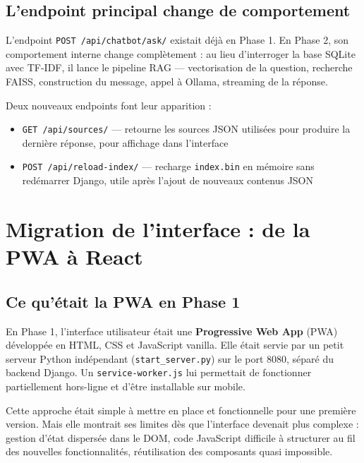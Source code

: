 \documentclass[11pt,a4paper]{article}
\begin{document}
\subsection{L'endpoint principal change de comportement}

L'endpoint \texttt{POST /api/chatbot/ask/} existait déjà en
Phase 1. En Phase 2, son comportement interne change complètement :
au lieu d'interroger la base SQLite avec TF-IDF, il lance le
pipeline RAG --- vectorisation de la question, recherche FAISS,
construction du message, appel à Ollama, streaming de la réponse.

Deux nouveaux endpoints font leur apparition :

\begin{itemize}
    \item \texttt{GET /api/sources/} --- retourne les sources JSON
    utilisées pour produire la dernière réponse, pour affichage
    dans l'interface
    \item \texttt{POST /api/reload-index/} --- recharge \texttt{index.bin}
    en mémoire sans redémarrer Django, utile après l'ajout de
    nouveaux contenus JSON
\end{itemize}

\clearpage

\section{Migration de l'interface : de la PWA à React}

\subsection{Ce qu'était la PWA en Phase 1}

En Phase 1, l'interface utilisateur était une \textbf{Progressive Web App}
(PWA) développée en HTML, CSS et JavaScript vanilla. Elle était servie
par un petit serveur Python indépendant (\texttt{start\_server.py}) sur
le port 8080, séparé du backend Django. Un \texttt{service-worker.js}
lui permettait de fonctionner partiellement hors-ligne et d'être
installable sur mobile.

Cette approche était simple à mettre en place et fonctionnelle pour
une première version. Mais elle montrait ses limites dès que
l'interface devenait plus complexe : gestion d'état dispersée dans
le DOM, code JavaScript difficile à structurer au fil des nouvelles
fonctionnalités, réutilisation des composants quasi impossible.
\end{document}
